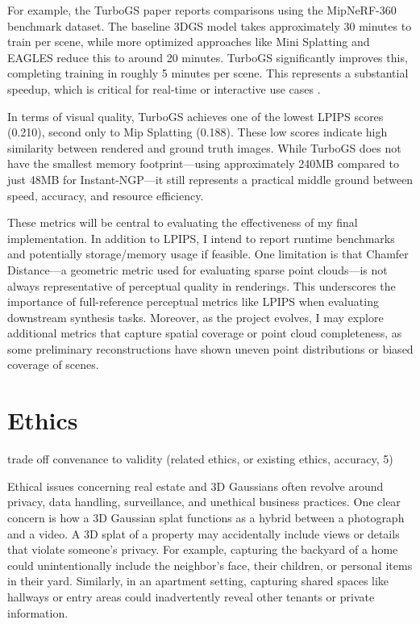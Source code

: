 \documentclass[10pt,twocolumn]{article}
\begin{document}
For example, the TurboGS paper reports comparisons using the MipNeRF-360 benchmark dataset. The baseline 3DGS model takes approximately 30 minutes to train per scene, while more optimized approaches like Mini Splatting and EAGLES reduce this to around 20 minutes. TurboGS significantly improves this, completing training in roughly 5 minutes per scene. This represents a substantial speedup, which is critical for real-time or interactive use cases \cite{lu2024turbogsaccelerating3dgaussian}.

In terms of visual quality, TurboGS achieves one of the lowest LPIPS scores (0.210), second only to Mip Splatting (0.188). These low scores indicate high similarity between rendered and ground truth images. While TurboGS does not have the smallest memory footprint—using approximately 240MB compared to just 48MB for Instant-NGP—it still represents a practical middle ground between speed, accuracy, and resource efficiency.

These metrics will be central to evaluating the effectiveness of my final implementation. In addition to LPIPS, I intend to report runtime benchmarks and potentially storage/memory usage if feasible. One limitation is that Chamfer Distance—a geometric metric used for evaluating sparse point clouds—is not always representative of perceptual quality in renderings. This underscores the importance of full-reference perceptual metrics like LPIPS when evaluating downstream synthesis tasks. Moreover, as the project evolves, I may explore additional metrics that capture spatial coverage or point cloud completeness, as some preliminary reconstructions have shown uneven point distributions or biased coverage of scenes.

\section{Ethics}

trade off convenance to validity (related ethics, or existing ethics, accuracy, 5)

Ethical issues concerning real estate and 3D Gaussians often revolve around privacy, data handling, surveillance, and unethical business practices. One clear concern is how a 3D Gaussian splat functions as a hybrid between a photograph and a video. A 3D splat of a property may accidentally include views or details that violate someone’s privacy. For example, capturing the backyard of a home could unintentionally include the neighbor’s face, their children, or personal items in their yard. Similarly, in an apartment setting, capturing shared spaces like hallways or entry areas could inadvertently reveal other tenants or private information.
\end{document}
